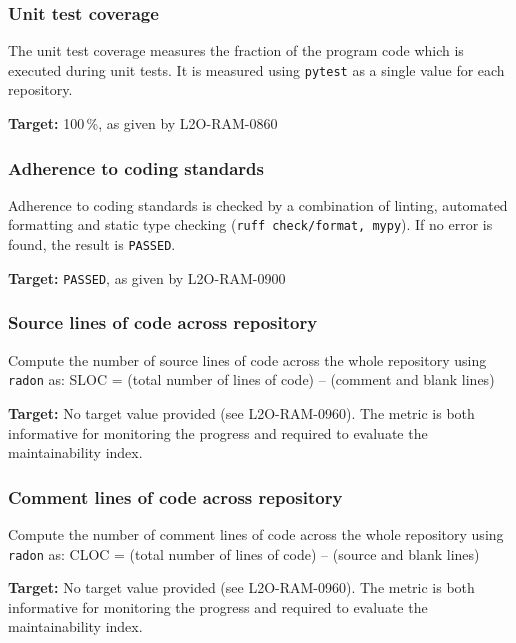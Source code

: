 
\subsubsection{Unit test coverage}

The unit test coverage measures the fraction of the program code which is executed during unit tests. It is measured using \texttt{pytest} as a single value for each repository.

\textbf{Target:} 100\,\%, as given by L2O-RAM-0860


\subsubsection{Adherence to coding standards}

Adherence to coding standards is checked by a combination of linting, automated formatting and static type checking (\texttt{ruff check/format, mypy}). If no error is found, the result is \texttt{PASSED}.

\textbf{Target:} \texttt{PASSED}, as given by L2O-RAM-0900


\subsubsection{Source lines of code across repository}

Compute the number of source lines of code across the whole repository using \texttt{radon} as: SLOC = (total number of lines of code) – (comment and blank lines)

\textbf{Target:} No target value provided (see L2O-RAM-0960). The metric is both informative for monitoring the progress and required to evaluate the maintainability index.


\subsubsection{Comment lines of code across repository}

Compute the number of comment lines of code across the whole repository using \texttt{radon} as: CLOC = (total number of lines of code) – (source and blank lines)

\textbf{Target:} No target value provided (see L2O-RAM-0960). The metric is both informative for monitoring the progress and required to evaluate the maintainability index.

